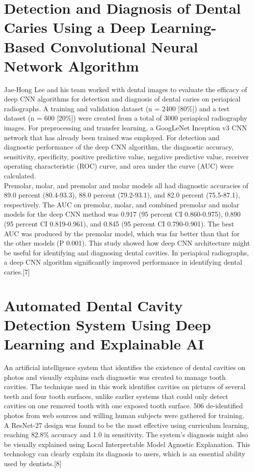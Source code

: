 \section{Detection and Diagnosis of Dental Caries Using a Deep Learning-Based Convolutional Neural Network Algorithm} Jae-Hong Lee and his team worked with dental images to evaluate the efficacy of deep CNN algorithms for detection and diagnosis of dental caries on periapical radiographs. A training and validation dataset (n = 2400 [80\%]) and a test dataset (n = 600 [20\%]) were created from a total of 3000 periapical radiography images. For preprocessing and transfer learning, a GoogLeNet Inception v3 CNN network that has already been trained was employed. For detection and diagnostic performance of the deep CNN algorithm, the diagnostic accuracy, sensitivity, specificity, positive predictive value, negative predictive value, receiver operating characteristic (ROC) curve, and area under the curve (AUC) were calculated. \\
Premolar, molar, and premolar and molar models all had diagnostic accuracies of 89.0 percent (80.4-93.3), 88.0 percent (79.2-93.1), and 82.0 percent (75.5-87.1), respectively. The AUC on premolar, molar, and combined premolar and molar models for the deep CNN method was 0.917 (95 percent CI 0.860-0.975), 0.890 (95 percent CI 0.819-0.961), and 0.845 (95 percent CI 0.790-0.901). The best AUC was produced by the premolar model, which was far better than that for the other models (P 0.001). This study showed how deep CNN architecture might be useful for identifying and diagnosing dental cavities. In periapical radiographs, a deep CNN algorithm significantly improved performance in identifying dental caries.[7]\\
\section{Automated Dental Cavity Detection System Using Deep Learning and Explainable AI}
An artificial intelligence system that identifies the existence of dental cavities on photos and visually explains each diagnostic was created to manage tooth cavities. The technique used in this work identifies cavities on pictures of several teeth and four tooth surfaces, unlike earlier systems that could only detect cavities on one removed tooth with one exposed tooth surface. 506 de-identified photos from web sources and willing human subjects were gathered for training. A ResNet-27 design was found to be the most effective using curriculum learning, reaching 82.8\% accuracy and 1.0 in sensitivity. The system's diagnosis might also be visually explained using Local Interpretable Model Agnostic Explanation. This technology can clearly explain its diagnosis to users, which is an essential ability used by dentists.[8]

